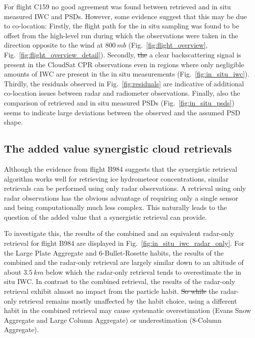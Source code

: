 \documentclass[journal abbreviation, manuscript]{copernicus}
\providecommand{\DIFadd}[1]{{\protect\color{blue}\uwave{#1}}} %
\providecommand{\DIFdel}[1]{{\protect\color{red}\sout{#1}}}                      %
\providecommand{\DIFaddbegin}{} %
\providecommand{\DIFaddend}{} %
\providecommand{\DIFdelbegin}{} %
\providecommand{\DIFdelend}{} %
\begin{document}
For flight C159 no good agreement was found between retrieved and in situ
measured IWC and PSDs. However, some evidence suggest that this may be due to
co-location: Firstly, the flight path for the in situ sampling was found to be
offset from the high-level run during which the observations were taken in the
direction opposite to the wind at $800\ \unit{mb}$
(Fig.~\ref{fig:flight_overview}, Fig.~\ref{fig:flight_overview_detail}).
Secondly, \DIFdelbegin \DIFdel{the }\DIFdelend a clear backscattering signal is present in the CloudSat CPR
observations even in regions where only negligible amounts of IWC are present in
the in situ measurements (Fig.~\ref{fig:in_situ_iwc}). Thirdly, the residuals
observed in Fig.~\ref{fig:residuals} are indicative of additional co-location
issues between radar and radiometer observations. Finally, also the
comparison of retrieved and in situ measured PSDs (Fig.~\ref{fig:in_situ_psds})
seems to indicate large deviations between the observed and the assumed PSD
shape.

\subsection{The added value synergistic cloud retrievals}

Although the evidence from flight B984 suggests that the synergistic
retrieval algorithm works well for retrieving ice hydrometeor concentrations,
similar retrievals can be performed using only radar observations. A retrieval
using only radar observations has the obvious advantage of requiring only
a single sensor and being computationally much less complex. This naturally
leads to the question of the added value that a synergistic retrieval
can provide.

To investigate this, the results of the combined and an equivalent radar-only
retrieval for flight B984 are displayed in
Fig.~\ref{fig:in_situ_iwc_radar_only}. For the Large Plate Aggregate and
6-Bullet-Rosette habits, the results of the combined and the radar-only
retrieval are largely similar down to an altitude of about $3.5\ \unit{km}$
below which the radar-only retrieval tends to overestimate the in situ IWC. In
contrast to the combined retrieval, the results of the radar-only retrieval
exhibit almost no impact from the particle habit. \DIFdelbegin \DIFdel{So while }\DIFdelend \DIFaddbegin \DIFadd{While }\DIFaddend the radar-only retrieval
remains mostly unaffected by the habit choice, using a different habit in the
combined retrieval may cause systematic overestimation (Evans Snow Aggregate and
Large Column Aggregate) or underestimation (8-Column Aggregate).
\end{document}
